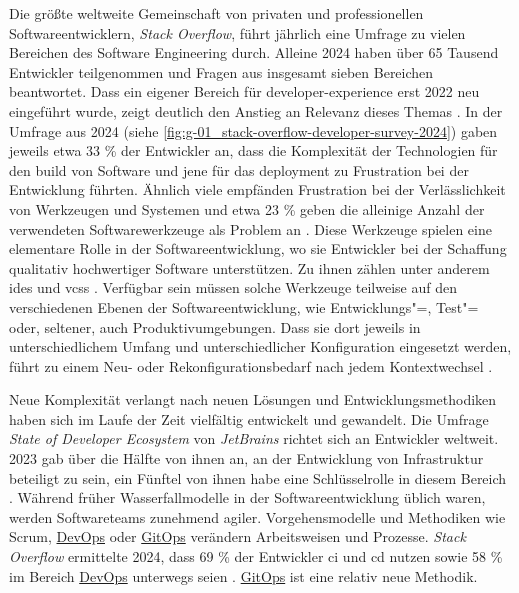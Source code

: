 Die größte weltweite Gemeinschaft von privaten und professionellen Softwareentwicklern, \textit{Stack Overflow}, führt jährlich eine Umfrage zu vielen Bereichen des Software Engineering durch. Alleine 2024 haben über 65 Tausend Entwickler teilgenommen und Fragen aus insgesamt sieben Bereichen beantwortet. Dass ein eigener Bereich für \Gls{developer-experience} erst 2022 neu eingeführt wurde, zeigt deutlich den Anstieg an Relevanz dieses Themas \cite{212:Developer-Survey}. In der Umfrage aus 2024 (siehe \autoref{fig:g-01_stack-overflow-developer-survey-2024}) gaben jeweils etwa 33 \% der Entwickler an, dass die Komplexität der Technologien für den \Gls{build} von Software und jene für das \Gls{deployment} zu Frustration bei der Entwicklung führten. Ähnlich viele empfänden Frustration bei der Verlässlichkeit von Werkzeugen und Systemen und etwa 23 \% geben die alleinige Anzahl der verwendeten Softwarewerkzeuge als Problem an \cite{206:Developer-Survey-2024}. Diese Werkzeuge spielen eine elementare Rolle in der Softwareentwicklung, wo sie Entwickler bei der Schaffung qualitativ hochwertiger Software unterstützen. Zu ihnen zählen unter anderem \glspl{ide} und \glspl{vcs} \cite{014:Managing-Container-based-Software-Development-Environments}. Verfügbar sein müssen solche Werkzeuge teilweise auf den verschiedenen Ebenen der Softwareentwicklung, wie Entwicklungs"=, Test"= oder, seltener, auch Produktivumgebungen. Dass sie dort jeweils in unterschiedlichem Umfang und unterschiedlicher Konfiguration eingesetzt werden, führt zu einem Neu- oder Rekonfigurationsbedarf nach jedem Kontextwechsel \cite{003:Infrastructure-from-Code}.

Neue Komplexität verlangt nach neuen Lösungen und Entwicklungsmethodiken haben sich im Laufe der Zeit vielfältig entwickelt und gewandelt. Die Umfrage \textit{State of Developer Ecosystem} von \textit{JetBrains} richtet sich an Entwickler weltweit. 2023 gab über die Hälfte von ihnen an, an der Entwicklung von Infrastruktur beteiligt zu sein, ein Fünftel von ihnen habe eine Schlüsselrolle in diesem Bereich \cite{207:Developer-Ecosystem}. Während früher Wasserfallmodelle in der Softwareentwicklung üblich waren, werden Softwareteams zunehmend agiler. Vorgehensmodelle und Methodiken wie Scrum, \hyperref[sec:03-01_devops]{DevOps} oder \hyperref[sec:03-03_gitops]{GitOps} verändern Arbeitsweisen und Prozesse. \textit{Stack Overflow} ermittelte 2024, dass 69 \% der Entwickler \gls{ci} und \gls{cd} nutzen sowie 58 \% im Bereich \hyperref[sec:03-01_devops]{DevOps} unterwegs seien \cite{206:Developer-Survey-2024}. \hyperref[sec:03-03_gitops]{GitOps} ist eine relativ neue Methodik.

